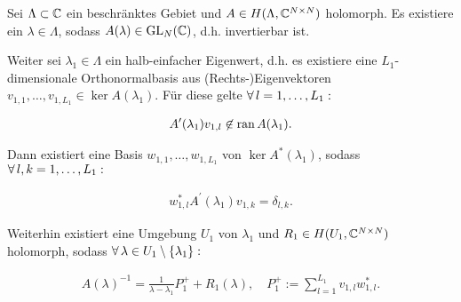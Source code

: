 \begin{theorem} \label{keldysh_nicht_linear}

    Sei $\Lambda \subset \mathbb{C}$ ein beschränktes Gebiet und $A \in H(\Lambda, \mathbb{C}^{N \times N})$ holomorph.
    Es existiere ein $\lambda \in \Lambda$, sodass $A(\lambda) \in \operatorname{GL}_N(\mathbb{C})$, d.h. invertierbar ist.

    Weiter sei $\lambda_1 \in \Lambda$ ein halb-einfacher Eigenwert, d.h. es existiere eine $L_1$-dimensionale Orthonormalbasis aus (Rechts-)Eigenvektoren $v_{1, 1}, \dots, v_{1, L_1} \in \ker A(\lambda_1)$.
    Für diese gelte $\forall \, l = 1, \dots, L_1:$
    
    \begin{align*}
        A^\prime(\lambda_1) v_{1, l}
        \not \in
        \operatorname{ran} A(\lambda_1).
    \end{align*}

    Dann existiert eine Basis $w_{1, 1}, \dots, w_{1, L_1}$ von $\ker A^\ast(\lambda_1)$, sodass $\forall \, l, k = 1, \dots, L_1:$

    \begin{align}
        w_{1, l}^\ast A^\prime(\lambda_1) v_{1, k} = \delta_{l, k}.
    \end{align}

    Weiterhin existiert eine Umgebung $U_1$ von $\lambda_1$ und $R_1 \in H(U_1, \mathbb{C}^{N \times N})$ holomorph, sodass $\forall \, \lambda \in U_1 \setminus {\left \{ \lambda_1 \right \}}:$

    \begin{align}
        A(\lambda)^{-1}
        =
        \frac{1}{\lambda - \lambda_1} P_1^+
        +
        R_1(\lambda),
        \quad
        P_1^+
        :=
        \sum_{l=1}^{L_1}
            v_{1, l} w_{1, l}^\ast.
    \end{align}

\end{theorem}
